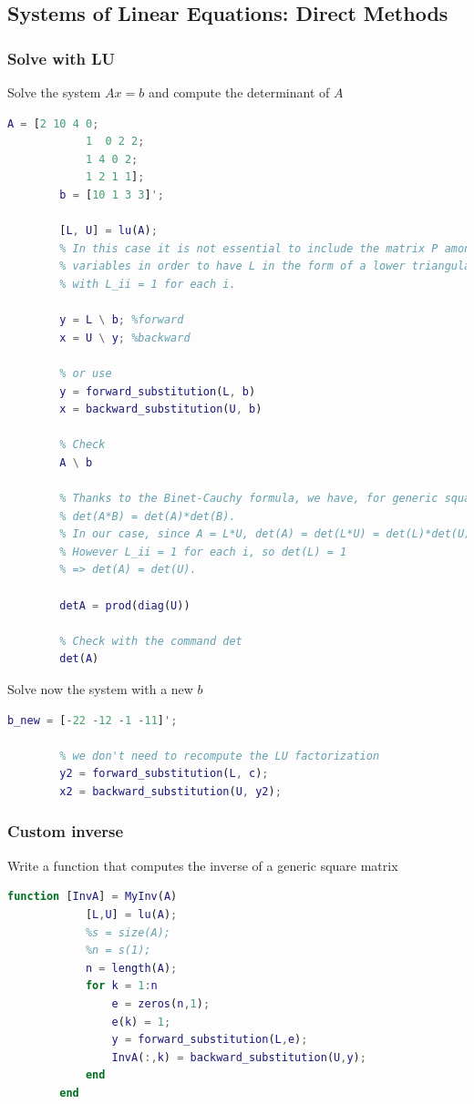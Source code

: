 \subsection{Systems of Linear Equations: Direct Methods}
    \subsubsection{Solve with LU}
        Solve the system $Ax=b$ and compute the determinant of $A$
        \begin{lstlisting}[language=Matlab, escapeinside=`', gobble=8]
        A = [2 10 4 0;
            1  0 2 2;
            1 4 0 2;
            1 2 1 1];
        b = [10 1 3 3]';
       
        [L, U] = lu(A);
        % In this case it is not essential to include the matrix P among the output
        % variables in order to have L in the form of a lower triangular matrix
        % with L_ii = 1 for each i.
        
        y = L \ b; %forward
        x = U \ y; %backward
       
        % or use
        y = forward_substitution(L, b)
        x = backward_substitution(U, b)
        
        % Check
        A \ b
        
        % Thanks to the Binet-Cauchy formula, we have, for generic square matrices,
        % det(A*B) = det(A)*det(B).
        % In our case, since A = L*U, det(A) = det(L*U) = det(L)*det(U).
        % However L_ii = 1 for each i, so det(L) = 1
        % => det(A) = det(U).
        
        detA = prod(diag(U))
        
        % Check with the command det
        det(A)
        \end{lstlisting}

        Solve now the system with a new $b$
        \begin{lstlisting}[language=Matlab, escapeinside=`', gobble=8]
        b_new = [-22 -12 -1 -11]';    

        % we don't need to recompute the LU factorization
        y2 = forward_substitution(L, c);
        x2 = backward_substitution(U, y2);
        \end{lstlisting}
    
    \subsubsection{Custom inverse}
        Write a function that computes the inverse of a generic square matrix
        \begin{lstlisting}[language=Matlab, escapeinside=`', gobble=8]
        function [InvA] = MyInv(A)
            [L,U] = lu(A);
            %s = size(A);
            %n = s(1);
            n = length(A);
            for k = 1:n
                e = zeros(n,1);
                e(k) = 1;
                y = forward_substitution(L,e);
                InvA(:,k) = backward_substitution(U,y); 
            end
        end
        \end{lstlisting}

